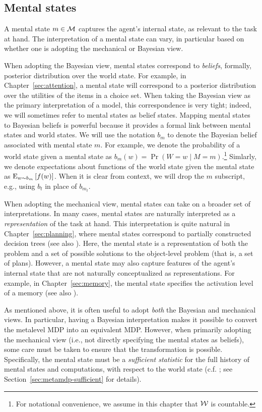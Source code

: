 \subsection{Mental states}

A mental state $m \in \M$ captures the agent's internal state, as relevant to the task at hand. The interpretation of a mental state can vary, in particular based on whether one is adopting the mechanical or Bayesian view. 

When adopting the Bayesian view, mental states correspond to \emph{beliefs}, formally, posterior distribution over the world state. For example, in Chapter~\ref{sec:attention}, a mental state will correspond to a posterior distribution over the utilities of the items in a choice set. When taking the Bayesian view as the primary interpretation of a model, this correspondence is very tight; indeed, we will sometimes refer to mental states as belief states. Mapping mental states to Bayesian beliefs is powerful because it provides a formal link between mental states and world states. We will use the notation $b_m$ to denote the Bayesian belief associated with mental state $m$. For example, we denote the probability of a world state given a mental state as $b_m(w) = \Pr(W = w \mid M = m)$.\footnote{%
  For notational convenience, we assume in this chapter that $\W$ is countable.
} Simlarly, we denote expectations about functions of the world state given the mental state as $\expectunder{f(w)}{w \sim b_m}$. When it is clear from context, we will drop the $m$ subscript, e.g., using $b_t$ in place of $b_{m_t}$.

When adopting the mechanical view, mental states can take on a broader set of interpretations. In many cases, mental states are naturally interpreted as a \emph{representation} of the task at hand. This interpretation is quite natural in Chapter~\ref{sec:planning}, where mental states correspond to partially constructed decision trees (see also \citealp[Chapter 5]{hay2016principles}). Here, the mental state is a representation of both the problem and a set of possible solutions to the object-level problem (that is, a set of plans). However, a mental state may also capture features of the agent's internal state that are not naturally conceptualized as representations. For example, in Chapter~\ref{sec:memory}, the mental state specifies the activation level of a memory (see also \citealp{suchow2016deciding}).

As mentioned above, it is often useful to adopt \emph{both} the Bayesian and mechanical views. In particular, having a Bayesian interpretation makes it possible to convert the metalevel MDP into an equivalent MDP. However, when primarily adopting the mechanical view (i.e., not directly specifying the mental states as beliefs), some care must be taken to ensure that the transformation is possible. Specifically, the mental state must be a \emph{sufficient statistic} for the full history of mental states and computations, with respect to the world state (c.f. \citealp{kaelbling1998planningb}; see Section~\ref{sec:metamdp-sufficient} for details).

